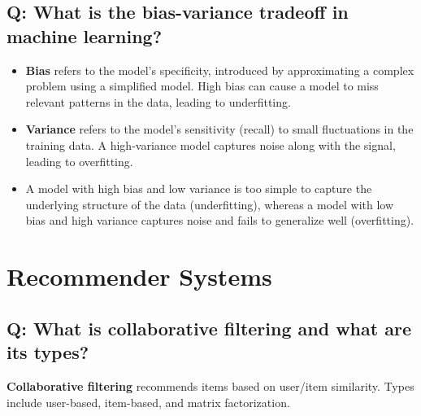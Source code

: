 \documentclass[11pt]{article}
\begin{document}
\subsection*{Q: What is the bias-variance tradeoff in machine learning?}
\begin{itemize}
	\item \textbf{Bias} refers to the model's specificity, introduced by approximating a complex problem using a simplified model. High bias can cause a model to miss relevant patterns in the data, leading to underfitting.
	\item \textbf{Variance} refers to the model's sensitivity (recall) to small fluctuations in the training data. A high-variance model captures noise along with the signal, leading to overfitting.
	\item A model with high bias and low variance is too simple to capture the underlying structure of the data (underfitting), whereas a model with low bias and high variance captures noise and fails to generalize well (overfitting).
\end{itemize}

\section{Recommender Systems}

\subsection*{Q: What is collaborative filtering and what are its types?}
\textbf{Collaborative filtering} recommends items based on user/item similarity. Types include user-based, item-based, and matrix factorization.
\end{document}

